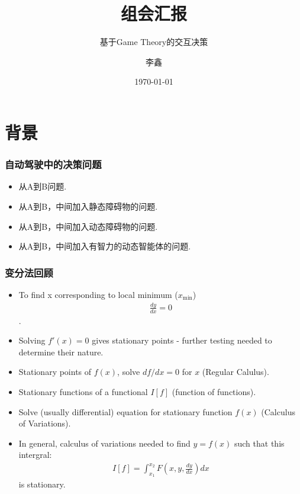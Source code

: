 \documentclass[UTF8, aspectratio=169, 10pt]{ctexbeamer}
\title{组会汇报}
\subtitle{基于Game Theory的交互决策}
\author{李鑫}
\institute{吉林大学}
\date{\today}
\begin{document}
\frame{\titlepage}
\frame{\tableofcontents}


\section{背景}
\begin{frame}
  \frametitle{自动驾驶中的决策问题}
  \begin{itemize}
  \item 从A到B问题.
  \item 从A到B，中间加入静态障碍物的问题.
  \item 从A到B，中间加入动态障碍物的问题.
  \item 从A到B，中间加入有智力的动态智能体的问题.
  \end{itemize}
\end{frame}

\begin{frame}
  \frametitle{变分法回顾}
  \begin{itemize}
  \item To find x corresponding to local minimum ($x_{\min}$)
    \begin{align}
      \frac{dy}{dx} = 0
    \end{align}.
  \item Solving $f'(x)=0$ gives stationary points - further testing needed to
    determine their nature.
  \item Stationary points of $f(x)$, solve $df / dx=0$ for $x$ (Regular
    Calulus).
  \item Stationary functions of a functional $I[f]$ (function of functions).
  \item Solve (usually differential) equation for stationary function $f(x)$
    (Calculus of Variations).
  \item In general, calculus of variations needed to find $y=f(x)$ such that
    this intergral:
    \begin{align}
      I[f] = \int_{x_1}^{x_2} F( x, y, \frac{dy}{dx} ) dx
    \end{align}
    is stationary.
  \end{itemize}
\end{frame}
\end{document}
